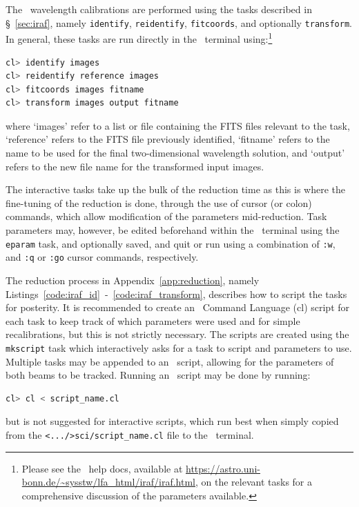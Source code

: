 The \iraf\ wavelength calibrations are performed using the tasks described in \S~\ref{sec:iraf}, namely \texttt{identify}, \texttt{reidentify}, \texttt{fitcoords}, and optionally \texttt{transform}. In general, these tasks are run directly in the \iraf\ terminal using:\footnote{Please see the \iraf\ help docs, available at \url{https://astro.uni-bonn.de/~sysstw/lfa_html/iraf/iraf.html}, on the relevant tasks for a comprehensive discussion of the parameters available.}
\begin{lstlisting}[language=bash]
cl> identify images
cl> reidentify reference images
cl> fitcoords images fitname
cl> transform images output fitname
\end{lstlisting}
{\parskip=0pt where} `images' refer to a list or file containing the \gls{FITS} files relevant to the task, `reference' refers to the \gls{FITS} file previously identified, `fitname' refers to the name to be used for the final two-dimensional wavelength solution, and `output' refers to the new file name for the transformed input images.

The interactive tasks take up the bulk of the reduction time as this is where the fine-tuning of the reduction is done, through the use of cursor (or colon) commands, which allow modification of the parameters mid-reduction. Task parameters may, however, be edited beforehand within the \iraf\ terminal using the \texttt{eparam} task, and optionally saved, and quit or run using a combination of \texttt{:w}, and \texttt{:q} or \texttt{:go} cursor commands, respectively.

The reduction process in Appendix~\ref{app:reduction}, namely Listings~\ref{code:iraf_id}~-~\ref{code:iraf_transform}, describes how to script the tasks for posterity. It is recommended to create an \iraf\ Command Language (cl) script for each task to keep track of which parameters were used and for simple recalibrations, but this is not strictly necessary. The scripts are created using the \texttt{mkscript} task which interactively asks for a task to script and parameters to use. Multiple tasks may be appended to an \iraf\ script, allowing for the parameters of both beams to be tracked. Running an \iraf\ script may be done by running:
\begin{lstlisting}[language=bash]
cl> cl < script_name.cl
\end{lstlisting}
{\parskip=0pt but} is not suggested for interactive scripts, which run best when simply copied from the \texttt{<.../>sci/script\_name.cl} file to the \iraf\ terminal.

